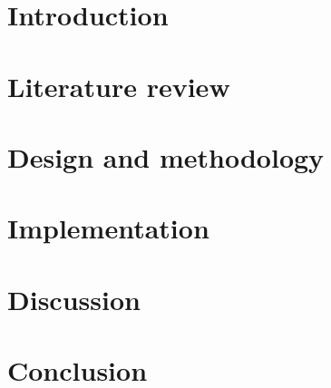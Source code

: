 \documentclass[12pt, a4paper]{report}
\begin{document}








\renewcommand*\contentsname{Table of contents}
\tableofcontents
\newpage

\listoffigures
\newpage

\listoftables
\newpage



    \chapter{Introduction}
    

    \chapter{Literature review}
    

    \chapter{Design and methodology}
    

    \chapter{Implementation}
    

    \chapter{Discussion}
    

    \chapter{Conclusion}
    
\end{document}
